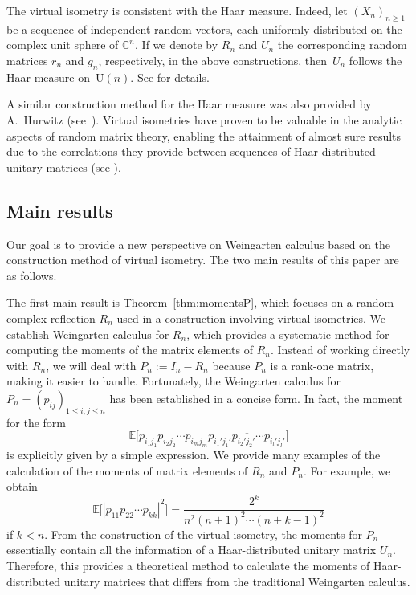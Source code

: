 \documentclass[pdftex]{sigma}
\numberwithin{equation}{section}
\theoremstyle{definition}
\newcommand{\UU}{\mathrm{U}}
\begin{document}
The virtual isometry is consistent with the Haar measure.
Indeed, let $(X_n)_{n \ge 1}$ be a sequence of independent random vectors, each uniformly distributed on the complex unit sphere of $\mathbb{C}^n$.
If we denote by $R_n$ and $U_n$ the corresponding random matrices $r_n$ and $g_n$, respectively,
in the above constructions, then~$U_n$ follows the Haar measure on~$\UU(n)$.
 See \cite[Proposition~3.1]{BNN} for details.

A similar construction method for the Haar measure was also provided by A.~Hurwitz (see~\cite{DiaconisForrester}).
Virtual isometries have proven to be valuable in the analytic aspects of random matrix theory, enabling the attainment of almost sure results due to the correlations they provide between sequences of Haar-distributed unitary matrices (see \cite{Assiotis, CNN}).


\subsection{Main results}

Our goal is to provide a new perspective on Weingarten calculus based on the construction method of virtual isometry.
The two main results of this paper are as follows.

The first main result is Theorem~\ref{thm:momentsP}, which focuses on a random complex reflection $R_n$ used in a construction involving virtual isometries.
We establish Weingarten calculus for $R_n$, which provides a systematic method for computing the moments of the matrix elements of $R_n$.
Instead of working directly with $R_n$,
we will deal with $P_n:=I_n-R_n$ because $P_n$ is a rank-one matrix, making it easier to handle.
Fortunately, the Weingarten calculus for $P_n=(p_{ij})_{1 \le i,j \le n}$ has been established in a concise form.
In fact, the moment for the form
\[
\mathbb{E} \bigl[ p_{i_1 j_1} p_{i_2 j_2} \cdots p_{i_m j_m}
\overline{p_{i_1' j_1'} p_{i_2' j_2'} \cdots p_{i_l' j_l'}}
\bigr]
\]
is explicitly given by a simple expression.
We provide many examples of the calculation of the moments of matrix elements of $R_n$ and $P_n$.
For example, we obtain
\[
\mathbb{E} \bigl[|p_{11} p_{22} \cdots p_{kk}|^2\bigr] = \frac{2^k}{n^2(n+1)^2 \cdots (n+k-1)^2}
\]
if $k<n$.
From the construction of the virtual isometry, the moments for $P_n$ essentially contain all the information of a Haar-distributed unitary matrix $U_n$.
Therefore, this provides a theoretical method to calculate the moments of Haar-distributed unitary matrices that differs from the traditional Weingarten calculus.
\end{document}
